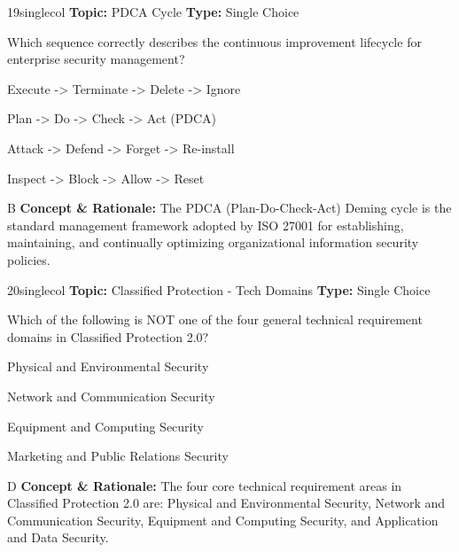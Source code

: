\begin{qcard}{19}{singlecol}
\textcolor{darkslate!75}{\small\textbf{Topic:} PDCA Cycle \hfill \textbf{Type:} Single Choice}\vspace{0.4em}\par
Which sequence correctly describes the continuous improvement lifecycle for enterprise security management?
\begin{qoptions}
\item Execute -\textgreater{} Terminate -\textgreater{} Delete -\textgreater{} Ignore
\item Plan -\textgreater{} Do -\textgreater{} Check -\textgreater{} Act (PDCA)
\item Attack -\textgreater{} Defend -\textgreater{} Forget -\textgreater{} Re-install
\item Inspect -\textgreater{} Block -\textgreater{} Allow -\textgreater{} Reset
\end{qoptions}
\end{qcard}
\nopagebreak
\begin{explainbox}{B}
\textbf{Concept \& Rationale:} The PDCA (Plan-Do-Check-Act) Deming cycle is the standard management framework adopted by ISO 27001 for establishing, maintaining, and continually optimizing organizational information security policies.
\end{explainbox}

\begin{qcard}{20}{singlecol}
\textcolor{darkslate!75}{\small\textbf{Topic:} Classified Protection - Tech Domains \hfill \textbf{Type:} Single Choice}\vspace{0.4em}\par
Which of the following is NOT one of the four general technical requirement domains in Classified Protection 2.0?
\begin{qoptions}
\item Physical and Environmental Security
\item Network and Communication Security
\item Equipment and Computing Security
\item Marketing and Public Relations Security
\end{qoptions}
\end{qcard}
\nopagebreak
\begin{explainbox}{D}
\textbf{Concept \& Rationale:} The four core technical requirement areas in Classified Protection 2.0 are: Physical and Environmental Security, Network and Communication Security, Equipment and Computing Security, and Application and Data Security.
\end{explainbox}

